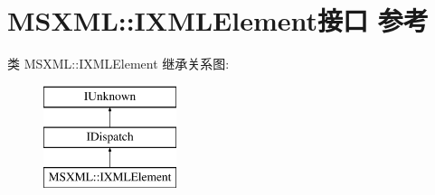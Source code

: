 \hypertarget{interface_m_s_x_m_l_1_1_i_x_m_l_element}{}\section{M\+S\+X\+ML\+:\+:I\+X\+M\+L\+Element接口 参考}
\label{interface_m_s_x_m_l_1_1_i_x_m_l_element}
类 M\+S\+X\+ML\+:\+:I\+X\+M\+L\+Element 继承关系图\+:\begin{figure}[H]
\begin{center}
\leavevmode
\includegraphics[height=3.000000cm]{interface_m_s_x_m_l_1_1_i_x_m_l_element}
\end{center}
\end{figure}
